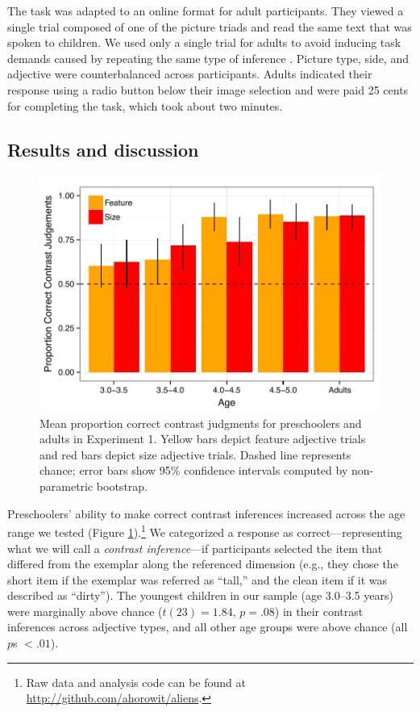 \documentclass[man]{apa2}
\begin{document}
The task was adapted to an online format for adult participants. They viewed a single trial composed of one of the picture triads and read the same text that was spoken to children. We used only a single trial for adults to avoid inducing task demands caused by repeating the same type of inference \cite{frank2012}. Picture type, side, and adjective were counterbalanced across participants.  Adults indicated their response using a radio button below their image selection and were paid 25 cents for completing the task, which took about two minutes. 

\subsection{Results and discussion}

\begin{figure}[t] 
  \begin{center} 
    \includegraphics[width=4.5in]{figures/expt1_mod.pdf} 
    \caption{\label{fig:expt1_kidsAdults} Mean proportion correct contrast judgments for preschoolers and adults in Experiment 1. Yellow bars depict feature adjective trials and red bars depict size adjective trials. Dashed line represents chance; error bars show 95\% confidence intervals computed by non-parametric bootstrap.}
  \end{center} 
  \vspace{-10ex} 
\end{figure}	

Preschoolers' ability to make correct contrast inferences increased across the age range we tested (Figure \ref{fig:expt1_kidsAdults}).\footnote{Raw data and analysis code can be found at \url{http://github.com/ahorowit/aliens}.} We categorized a response as correct---representing what we will call a \emph{contrast inference}---if participants selected the item that differed from the exemplar along the referenced dimension (e.g., they chose the short item if the exemplar was referred as ``tall,'' and the clean item if it was described as ``dirty'').  The youngest children in our sample (age 3.0--3.5 years) were marginally above chance ($t(23) = 1.84$, $p = .08$) in their contrast inferences across adjective types, and all other age groups were above chance (all $p$s $< .01$).
\end{document}
